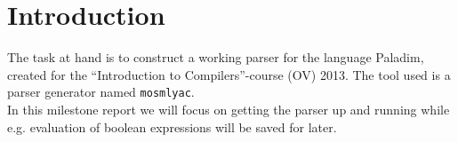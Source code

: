 \section{Introduction}
The task at hand is to construct a working parser for the language Paladim,
created for the ``Introduction to Compilers''-course (OV) 2013. The tool used is
a parser generator named \texttt{mosmlyac}.\\
In this milestone report we will focus on getting the parser up and running
while e.g. evaluation of boolean expressions will be saved for later.
